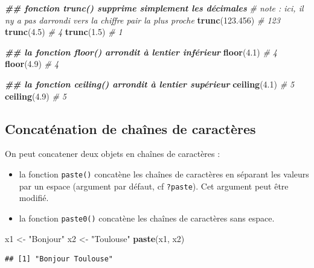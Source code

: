 \documentclass[
]{book}
\newenvironment{Shaded}{\begin{snugshade}}{\end{snugshade}}
\newcommand{\CommentTok}[1]{\textcolor[rgb]{0.56,0.35,0.01}{\textit{#1}}}
\newcommand{\DocumentationTok}[1]{\textcolor[rgb]{0.56,0.35,0.01}{\textbf{\textit{#1}}}}
\newcommand{\FloatTok}[1]{\textcolor[rgb]{0.00,0.00,0.81}{#1}}
\newcommand{\FunctionTok}[1]{\textcolor[rgb]{0.13,0.29,0.53}{\textbf{#1}}}
\newcommand{\NormalTok}[1]{#1}
\newcommand{\OtherTok}[1]{\textcolor[rgb]{0.56,0.35,0.01}{#1}}
\newcommand{\StringTok}[1]{\textcolor[rgb]{0.31,0.60,0.02}{#1}}
\providecommand{\tightlist}{%
  \setlength{\itemsep}{0pt}\setlength{\parskip}{0pt}}
\begin{document}
\begin{Shaded}
\begin{Highlighting}[]
\DocumentationTok{\#\# fonction trunc() supprime simplement les décimales}
\CommentTok{\# note : ici, il n\textquotesingle{}y a pas d\textquotesingle{}arrondi vers la chiffre pair la plus proche}
\FunctionTok{trunc}\NormalTok{(}\FloatTok{123.456}\NormalTok{) }\CommentTok{\# 123}
\FunctionTok{trunc}\NormalTok{(}\FloatTok{4.5}\NormalTok{) }\CommentTok{\# 4}
\FunctionTok{trunc}\NormalTok{(}\FloatTok{1.5}\NormalTok{) }\CommentTok{\# 1}

\DocumentationTok{\#\# la fonction floor() arrondit à l\textquotesingle{}entier inférieur}
\FunctionTok{floor}\NormalTok{(}\FloatTok{4.1}\NormalTok{) }\CommentTok{\# 4}
\FunctionTok{floor}\NormalTok{(}\FloatTok{4.9}\NormalTok{) }\CommentTok{\# 4}

\DocumentationTok{\#\# la fonction ceiling() arrondit à l\textquotesingle{}entier supérieur}
\FunctionTok{ceiling}\NormalTok{(}\FloatTok{4.1}\NormalTok{) }\CommentTok{\# 5}
\FunctionTok{ceiling}\NormalTok{(}\FloatTok{4.9}\NormalTok{) }\CommentTok{\# 5}
\end{Highlighting}
\end{Shaded}

\subsection{Concaténation de chaînes de caractères}\label{concatuxe9nation-de-chauxeenes-de-caractuxe8res}

On peut concatener deux objets en chaînes de caractères :

\begin{itemize}
\tightlist
\item
  la fonction \texttt{paste()} concatène les chaînes de caractères en séparant les valeurs par un espace (argument par défaut, cf \texttt{?paste}). Cet argument peut être modifié.
\item
  la fonction \texttt{paste0()} concatène les chaînes de caractères sans espace.
\end{itemize}

\begin{Shaded}
\begin{Highlighting}[]
\NormalTok{x1 }\OtherTok{\textless{}{-}} \StringTok{"Bonjour"}
\NormalTok{x2 }\OtherTok{\textless{}{-}} \StringTok{"Toulouse"}
\FunctionTok{paste}\NormalTok{(x1, x2)}
\end{Highlighting}
\end{Shaded}

\begin{verbatim}
## [1] "Bonjour Toulouse"
\end{verbatim}
\end{document}
